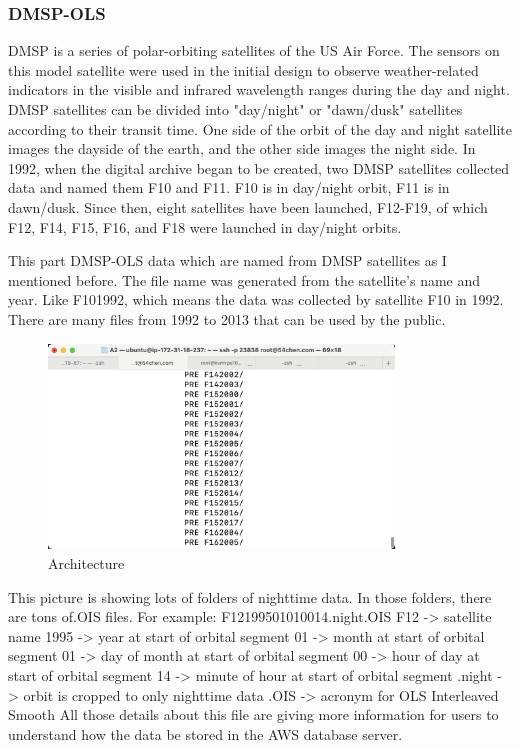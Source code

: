 \documentclass[conference]{IEEEtran}
\begin{document}
	\subsubsection{DMSP-OLS}
	DMSP is a series of polar-orbiting satellites of the US Air Force. The sensors on this model satellite were used in the initial design to observe weather-related indicators in the visible and infrared wavelength ranges during the day and night. DMSP satellites can be divided into "day/night" or "dawn/dusk" satellites according to their transit time. One side of the orbit of the day and night satellite images the dayside of the earth, and the other side images the night side. In 1992, when the digital archive began to be created, two DMSP satellites collected data and named them F10 and F11. F10 is in day/night orbit, F11 is in dawn/dusk. Since then, eight satellites have been launched, F12-F19, of which F12, F14, F15, F16, and F18 were launched in day/night orbits.
	
	This part DMSP-OLS data which are named from DMSP satellites as I mentioned before. The file name was generated from the satellite's name and year. Like F101992, which means the data was collected by satellite F10 in 1992. There are many files from 1992 to 2013 that can be used by the public.
	\begin{figure}[htbp]
		\centerline{\includegraphics[width=260pt]{images/2.png}}
		\caption{Architecture}
		\label{fig3}
	\end{figure}
This picture is showing lots of folders of nighttime data.  In those folders, there are tons of.OIS files. 
For example: F12199501010014.night.OIS 
F12 -> satellite name
1995 -> year at start of orbital segment
01 -> month at start of orbital segment
01 -> day of month at start of orbital segment
00 -> hour of day at start of orbital segment
14 -> minute of hour at start of orbital segment
.night -> orbit is cropped to only nighttime data
.OIS -> acronym for OLS Interleaved Smooth
All those details about this file are giving more information for users to understand how the data be stored in the AWS database server. 
\end{document}
